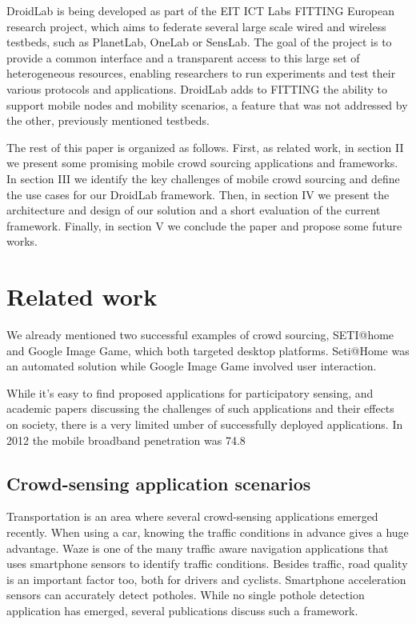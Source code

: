 \documentclass[conference,letterpaper]{IEEEtran}
\begin{document}
DroidLab is being developed as part of the EIT ICT Labs FITTING European research project, which aims to federate several large scale wired and wireless testbeds, such as PlanetLab, OneLab or SensLab. The goal of the project is to provide a common interface and a transparent access to this large set of heterogeneous resources, enabling researchers to run experiments and test their various protocols and applications. DroidLab adds to FITTING the ability to support mobile nodes and mobility scenarios, a feature that was not addressed by the other, previously mentioned testbeds.     

The rest of this paper is organized as follows. First, as related work, in section II we present some  promising mobile crowd sourcing applications and frameworks. In section III we  identify the key challenges of mobile crowd sourcing and define the use cases for our DroidLab framework. Then, in section IV we present the architecture and design of our solution and  a short evaluation of the current framework. Finally, in section V we conclude the paper and propose some future works.

\section{Related work}
\label{sec:related_work}
We already mentioned two successful examples of crowd sourcing, SETI@home and Google Image Game, which both targeted desktop platforms. Seti@Home was an automated solution while Google Image Game involved user interaction.

While it's easy to find proposed applications for participatory sensing, and academic papers discussing the challenges of such applications and their effects on society, there is a very limited umber of successfully deployed applications. In 2012 the mobile broadband penetration was  74.8%

\subsection{Crowd-sensing application scenarios}
Transportation is an area where several crowd-sensing applications emerged recently. When using a car, knowing the traffic conditions in advance gives a huge advantage. Waze is one of the many traffic aware navigation applications that uses smartphone sensors to identify traffic conditions. Besides traffic, road quality is an important factor too, both for drivers and cyclists. Smartphone acceleration sensors can accurately detect potholes. While no single pothole detection application has emerged, several publications discuss such a framework.
\end{document}
